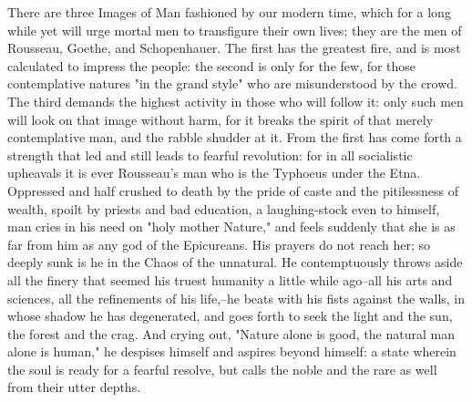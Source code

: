 There are three Images of Man fashioned by our modern time, which for
a long while yet will urge mortal men to transfigure their own lives;
they are the men of Rousseau, Goethe, and Schopenhauer. The first has
the greatest fire, and is most calculated to impress the people: the
second is only for the few, for those contemplative natures "in the
grand style" who are misunderstood by the crowd. The third demands
the highest activity in those who will follow it: only such men will
look on that image without harm, for it breaks the spirit of that
merely contemplative man, and the rabble shudder at it. From the
first has come forth a strength that led and still leads to fearful
revolution: for in all socialistic upheavals it is ever Rousseau's
man who is the Typhoeus under the Etna. Oppressed and half crushed to
death by the pride of caste and the pitilessness of wealth, spoilt by
priests and bad education, a laughing-stock even to himself, man
cries in his need on "holy mother Nature," and feels suddenly that
she is as far from him as any god of the Epicureans. His prayers do
not reach her; so deeply sunk is he in the Chaos of the unnatural. He
contemptuously throws aside all the finery that seemed his truest
humanity a little while ago--all his arts and sciences, all the
refinements of his life,--he beats with his fists against the walls,
in whose shadow he has degenerated, and goes forth to seek the light
and the sun, the forest and the crag. And crying out, "Nature alone
is good, the natural man alone is human," he despises himself and
aspires beyond himself: a state wherein the soul is ready for a
fearful resolve, but calls the noble and the rare as well from their
utter depths.

